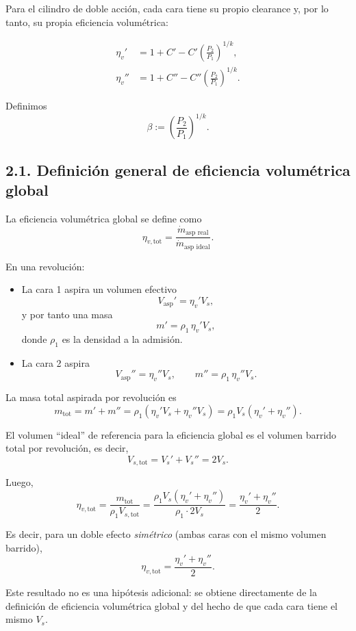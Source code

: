 \documentclass[11pt,a4paper]{article}
\begin{document}
Para el cilindro de doble acción, cada cara tiene su propio clearance y, por lo
tanto, su propia eficiencia volumétrica:

\begin{align*}
\eta_v'  &= 1 + C'  - C' \left(\frac{P_2}{P_1}\right)^{1/k},\\
\eta_v'' &= 1 + C'' - C''\left(\frac{P_2}{P_1}\right)^{1/k}.
\end{align*}

Definimos
\[
\beta := \left(\frac{P_2}{P_1}\right)^{1/k}.
\]

\subsection*{2.1. Definición general de eficiencia volumétrica global}

La eficiencia volumétrica global se define como
\[
\eta_{v,\text{tot}} =
\frac{\dot m_{\text{asp real}}}{\dot m_{\text{asp ideal}}}.
\]

En una revolución:

\begin{itemize}
  \item La cara 1 aspira un volumen efectivo
        \[
        V_{\text{asp}}' = \eta_v' V_s,
        \]
        y por tanto una masa
        \[
        m' = \rho_1\,\eta_v' V_s,
        \]
        donde $\rho_1$ es la densidad a la admisión.
  \item La cara 2 aspira
        \[
        V_{\text{asp}}'' = \eta_v'' V_s,
        \qquad
        m'' = \rho_1\,\eta_v'' V_s.
        \]
\end{itemize}

La masa total aspirada por revolución es
\[
m_{\text{tot}} = m' + m'' =
\rho_1\left(\eta_v' V_s + \eta_v'' V_s\right)
= \rho_1 V_s(\eta_v' + \eta_v'').
\]

El volumen ``ideal'' de referencia para la eficiencia global es el volumen
barrido total por revolución, es decir,
\[
V_{s,\text{tot}} = V_s' + V_s'' = 2 V_s.
\]

Luego,
\[
\eta_{v,\text{tot}} =
\frac{m_{\text{tot}}}{\rho_1 V_{s,\text{tot}}}
= \frac{\rho_1 V_s(\eta_v' + \eta_v'')}{\rho_1 \cdot 2 V_s}
= \frac{\eta_v' + \eta_v''}{2}.
\]

Es decir, para un doble efecto \emph{simétrico} (ambas caras con el mismo
volumen barrido),
\[
\boxed{
\eta_{v,\text{tot}} =
\frac{\eta_v' + \eta_v''}{2}.
}
\]

Este resultado no es una hipótesis adicional: se obtiene directamente de la
definición de eficiencia volumétrica global y del hecho de que cada cara tiene
el mismo $V_s$.
\end{document}

